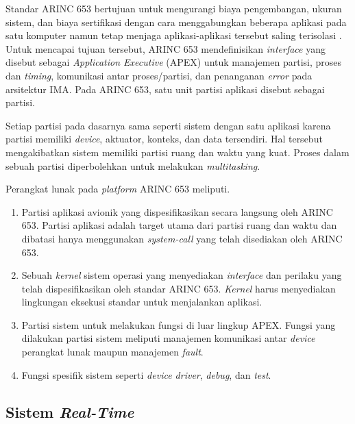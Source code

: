 Standar ARINC 653 bertujuan untuk mengurangi biaya pengembangan, ukuran sistem, dan biaya
sertifikasi dengan cara menggabungkan beberapa aplikasi pada satu komputer namun tetap menjaga
aplikasi-aplikasi tersebut saling terisolasi
\citep[pp.~3-30]{AirlinesElectronicEngineeringCommittee2012}.  Untuk mencapai tujuan tersebut,
ARINC 653 mendefinisikan \textit{interface} yang disebut sebagai \textit{Application Executive}
(APEX) untuk manajemen partisi, proses dan \textit{timing}, komunikasi antar proses/partisi, dan
penanganan \textit{error} pada arsitektur IMA.  Pada ARINC 653, satu unit partisi aplikasi
disebut sebagai partisi.

Setiap partisi pada dasarnya sama seperti sistem dengan satu aplikasi karena partisi memiliki
\textit{device}, aktuator, konteks, dan data tersendiri.  Hal tersebut mengakibatkan sistem
memiliki partisi ruang dan waktu yang kuat.  Proses dalam sebuah partisi diperbolehkan untuk
melakukan \textit{multitasking}.

Perangkat lunak pada \textit{platform} ARINC 653 meliputi.

\begin{enumerate}

    \item Partisi aplikasi avionik yang dispesifikasikan secara langsung oleh ARINC 653. Partisi
    	    aplikasi adalah target utama dari partisi ruang dan waktu dan dibatasi hanya
    	    menggunakan \textit{system-call} yang telah disediakan oleh ARINC 653.

    \item Sebuah \textit{kernel} sistem operasi yang menyediakan \textit{interface} dan perilaku
    	    yang telah dispesifikasikan oleh standar ARINC 653. \textit{Kernel} harus
    	    menyediakan lingkungan eksekusi standar untuk menjalankan aplikasi.

    \item Partisi sistem untuk melakukan fungsi di luar lingkup APEX. Fungsi yang dilakukan
    	    partisi sistem meliputi manajemen komunikasi antar \textit{device} perangkat lunak
    	    maupun manajemen \textit{fault}.

    \item Fungsi spesifik sistem seperti \textit{device driver}, \textit{debug}, dan
    	    \textit{test}.

\end{enumerate}

\subsection{Sistem \textit{Real-Time}}
\label{section:sistem_realtime}

